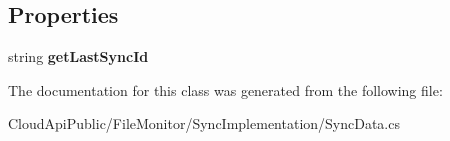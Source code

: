 \subsection*{Properties}
\begin{DoxyCompactItemize}
\item 
\hypertarget{class_file_monitor_1_1_sync_implementation_1_1_sync_data_adc24ba00ebf683be3e449debf4127994}{string {\bfseries get\-Last\-Sync\-Id}}\label{class_file_monitor_1_1_sync_implementation_1_1_sync_data_adc24ba00ebf683be3e449debf4127994}

\end{DoxyCompactItemize}


The documentation for this class was generated from the following file\-:\begin{DoxyCompactItemize}
\item 
Cloud\-Api\-Public/\-File\-Monitor/\-Sync\-Implementation/Sync\-Data.\-cs\end{DoxyCompactItemize}
